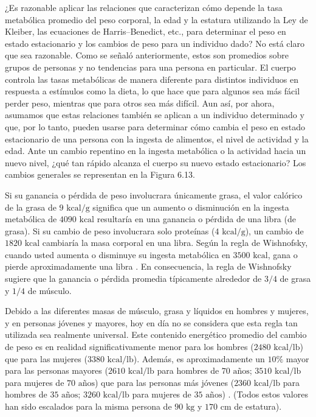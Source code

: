 \documentclass[12pt]{book}
\begin{document}
¿Es razonable aplicar las relaciones que caracterizan cómo depende la tasa metabólica promedio del peso corporal, la edad y la estatura utilizando la Ley de Kleiber, las ecuaciones de Harris--Benedict, etc., para determinar el peso en estado estacionario y los cambios de peso para un individuo dado? No está claro que sea razonable. Como se señaló anteriormente, estos son promedios sobre grupos de personas y no tendencias para una persona en particular. El cuerpo controla las tasas metabólicas de manera diferente para distintos individuos en respuesta a estímulos como la dieta, lo que hace que para algunos sea más fácil perder peso, mientras que para otros sea más difícil. Aun así, por ahora, asumamos que estas relaciones también se aplican a un individuo determinado y que, por lo tanto, pueden usarse para determinar cómo cambia el peso en estado estacionario de una persona con la ingesta de alimentos, el nivel de actividad y la edad. Ante un cambio repentino en la ingesta metabólica o la actividad hacia un nuevo nivel, ¿qué tan rápido alcanza el cuerpo su nuevo estado estacionario? Los cambios generales se representan en la Figura 6.13.

Si su ganancia o pérdida de peso involucrara únicamente grasa, el valor calórico de la grasa de $9\text{ kcal/g}$ significa que un aumento o disminución en la ingesta metabólica de $4090\text{ kcal}$ resultaría en una ganancia o pérdida de una libra (de grasa). Si su cambio de peso involucrara solo proteínas ($4\text{ kcal/g}$), un cambio de $1820\text{ kcal}$ cambiaría la masa corporal en una libra. Según la regla de Wishnofsky, cuando usted aumenta o disminuye su ingesta metabólica en $3500\text{ kcal}$, gana o pierde aproximadamente una libra \cite{108}. En consecuencia, la regla de Wishnofsky sugiere que la ganancia o pérdida promedia típicamente alrededor de $3/4$ de grasa y $1/4$ de músculo.

Debido a las diferentes masas de músculo, grasa y líquidos en hombres y mujeres, y en personas jóvenes y mayores, hoy en día no se considera que esta regla tan utilizada sea realmente universal. Este contenido energético promedio del cambio de peso es en realidad significativamente menor para los hombres ($2480\text{ kcal/lb}$) que para las mujeres ($3380\text{ kcal/lb}$). Además, es aproximadamente un $10\%$ mayor para las personas mayores ($2610\text{ kcal/lb}$ para hombres de $70\text{ años}$; $3510\text{ kcal/lb}$ para mujeres de $70\text{ años}$) que para las personas más jóvenes ($2360\text{ kcal/lb}$ para hombres de $35\text{ años}$; $3260\text{ kcal/lb}$ para mujeres de $35\text{ años}$) \cite{79}. (Todos estos valores han sido escalados para la misma persona de $90\text{ kg}$ y $170\text{ cm}$ de estatura).
\end{document}
